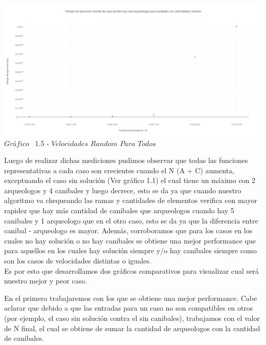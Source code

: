   
   \vspace*{0.3cm} \vspace*{0.3cm}
  \begin{center}
 \includegraphics[scale=0.45]{./EJ1/velrandom.png}
 {$Gr$\'a$fico$ \ 1.5 - $Velocidades$ $Random$ $Para$ $Todos$}
  \end{center}
  \vspace*{0.3cm}
  
Luego de realizar dichas mediciones pudimos observar que todas las funciones representativas a cada caso son crecientes cuando el N (A + C) aumenta, exceptuando el caso sin soluci\'on (Ver gr\'afico 1.1) el cual tiene un m\'aximo con 2 arqueologos y 4 canibales y luego decrece, esto se da ya que cuando nuestro algoritmo va chequeando las ramas y cantidades de elementos verifica con mayor rapidez que hay m\'as cantidad de canibales que arqueologos cuando hay 5 canibales y 1 arqueologo que en el otro caso, esto se da ya que la diferencia entre canibal - arqueologo es mayor.
 Adem\'as, corroboramos que para los casos en los cuales no hay soluci\'on o no hay canibales se obtiene una mejor performance que para aquellos en los cuales hay soluci\'on siempre y/o hay canibales siempre como son los casos de velocidades distintas o iguales. \\
Es por esto que desarrollamos dos gr\'aficos comparativos para visualizar cual ser\'a nuestro mejor y peor caso.

En el primero trabajaremos con los que se obtiene una mejor performance. Cabe aclarar que debido a que las entradas para un caso no son compatibles en otros (por ejemplo, el caso sin soluci\'on contra el sin canibales), trabajamos con el valor de N final, el cual se obtiene de sumar la cantidad de arqueologos con la cantidad de canibales.\\

